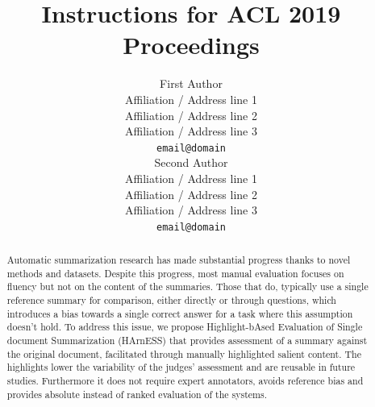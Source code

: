 \documentclass[11pt,a4paper]{article}
\title{Instructions for ACL 2019 Proceedings}
\author{First Author \\
  Affiliation / Address line 1 \\
  Affiliation / Address line 2 \\
  Affiliation / Address line 3 \\
  \texttt{email@domain} \\\And
  Second Author \\
  Affiliation / Address line 1 \\
  Affiliation / Address line 2 \\
  Affiliation / Address line 3 \\
  \texttt{email@domain} \\}
\date{}
\begin{document}
\maketitle
\begin{abstract}
  Automatic summarization research has made substantial progress thanks to novel methods and datasets. 
  Despite this progress, most manual evaluation focuses on fluency but not on the content of the summaries. Those that do, typically use a single reference summary for comparison, either directly or through questions, which introduces a bias towards a single correct answer for a task where this assumption doesn't hold.
  To address this issue, we propose Highlight-bAsed Evaluation of Single document Summarization (HArnESS) that provides assessment of a summary against the original document, facilitated through manually highlighted salient content. The highlights lower the variability of the judges' assessment and are reusable in future studies. Furthermore it does not require expert annotators, avoids reference bias and provides absolute instead of ranked evaluation of the systems.
  
\end{abstract}
\end{document}
